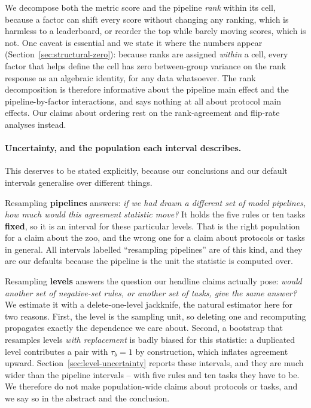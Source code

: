 \documentclass[11pt,a4paper]{article}
\begin{document}
We decompose both the metric score and the pipeline \emph{rank} within its cell, because a
factor can shift every score without changing any ranking, which is harmless to a
leaderboard, or reorder the top while barely moving scores, which is not. One caveat is
essential and we state it where the numbers appear
(Section~\ref{sec:structural-zero}): because ranks are assigned \emph{within} a cell, every
factor that helps define the cell has zero between-group variance on the rank response as
an algebraic identity, for any data whatsoever. The rank decomposition is therefore
informative about the pipeline main effect and the pipeline-by-factor interactions, and
says nothing at all about protocol main effects. Our claims about ordering rest on the
rank-agreement and flip-rate analyses instead.

\paragraph{Uncertainty, and the population each interval describes.} This deserves to be
stated explicitly, because our conclusions and our default intervals generalise over
different things.

Resampling \textbf{pipelines} answers: \emph{if we had drawn a different set of model
pipelines, how much would this agreement statistic move?} It holds the five rules or ten
tasks \textbf{fixed}, so it is an interval for these particular levels. That is the right
population for a claim about the zoo, and the wrong one for a claim about protocols or
tasks in general. All intervals labelled ``resampling pipelines'' are of this kind, and
they are our defaults because the pipeline is the unit the statistic is computed over.

Resampling \textbf{levels} answers the question our headline claims actually pose:
\emph{would another set of negative-set rules, or another set of tasks, give the same
answer?} We estimate it with a delete-one-level jackknife, the natural estimator here for
two reasons. First, the level is the sampling unit, so deleting one and recomputing
propagates exactly the dependence we care about. Second, a bootstrap that resamples levels
\emph{with replacement} is badly biased for this statistic: a duplicated level contributes a
pair with $\tau_b = 1$ by construction, which inflates agreement upward. Section~\ref{sec:level-uncertainty}
reports these intervals, and they are much wider than the pipeline intervals -- with five
rules and ten tasks they have to be. We therefore do not make population-wide claims about
protocols or tasks, and we say so in the abstract and the conclusion.
\end{document}
